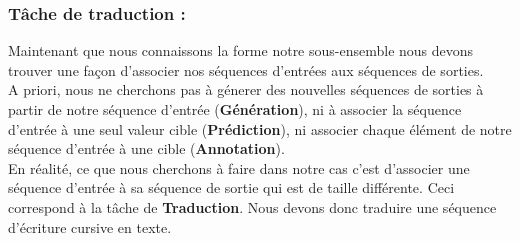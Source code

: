 \subsubsection{Tâche de traduction :}
Maintenant que nous connaissons la forme notre sous-ensemble nous devons trouver une façon d'associer nos séquences d'entrées aux séquences de sorties.\\
A priori, nous ne cherchons pas à génerer des nouvelles séquences de sorties à partir de notre séquence d'entrée (\textbf{Génération}), ni à associer la séquence d'entrée à une seul valeur cible (\textbf{Prédiction}), ni associer chaque élément de notre séquence d'entrée à une cible (\textbf{Annotation}). \\
En réalité, ce que nous cherchons à faire dans notre cas c'est d'associer une séquence d'entrée à sa séquence de sortie qui est de taille différente. Ceci correspond à la tâche de \textbf{Traduction}.
Nous devons donc traduire une séquence d'écriture cursive en texte.